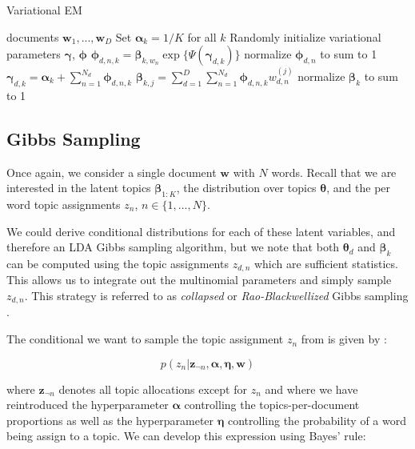 \documentclass{article}
\begin{document}
\begin{algorithm}[htb]
   \caption{Variational EM}
   \label{algo:EM}
\begin{algorithmic}
    documents $\mathbf{w}_1,...,\mathbf{w}_D$
   \STATE Set $\bm{\alpha}_k = 1 / K$ for all $k$ 
   \STATE Randomly initialize variational parameters $\bm{\gamma}$, $\bm{\phi}$ 
   \REPEAT
  	\STATE $\bm{\phi}_{d,n,k} = \bm{\beta}_{k, w_n} \exp\{\Psi(\bm{\gamma}_{d,k})\}$
  	\ENDFOR
  	\STATE normalize $\bm{\phi}_{d,n}$ to sum to 1
  	\STATE $\bm{\gamma}_{d,k} = \bm{\alpha}_k + \sum_{n=1}^{N_d} \bm{\phi}_{d,n,k}$
   \ENDFOR
   \ENDFOR
   \STATE $\bm{\beta}_{k,j} = \sum_{d=1}^D \sum_{n=1}^{N_d} \bm{\phi}_{d, n, k} w_{d,n}^{(j)}$
   \ENDFOR
   \STATE normalize $\bm{\beta}_k$ to sum to 1
   \ENDFOR
   \STATE 
\end{algorithmic}
\end{algorithm}

\subsection{Gibbs Sampling}

Once again, we consider a single document $\mathbf{w}$ with $N$ words. Recall that we are interested in the latent topics $\bm{\beta}_{1:K}$, the distribution over topics $\bm{\theta}$, and the per word topic assignments $z_{n}$, $n \in \{1,...,N\}$. 

We could derive conditional distributions for each of these latent variables, and therefore an LDA Gibbs sampling algorithm, but we note that both $\bm{\theta}_{d}$ and $\bm{\beta}_k$ can be computed using the topic assignments $z_{d,n}$ which are sufficient statistics. This allows us to integrate out the multinomial parameters and simply sample $z_{d,n}$. This strategy is referred to as \textit{collapsed} or \textit{Rao-Blackwellized} Gibbs sampling \cite{heinrich2005parameter}.

The conditional we want to sample the topic assignment $z_n$ from is given by :

\begin{equation*}
p(z_n|\mathbf{z}_{\neg n}, \bm{\alpha}, \bm{\eta}, \mathbf{w})
\end{equation*}

where $\mathbf{z}_{\neg n}$ denotes all topic allocations except for $z_n$ and where we have reintroduced the hyperparameter $\bm{\alpha}$ controlling the topics-per-document proportions as well as the hyperparameter $\bm{\eta}$ controlling the probability of a word being assign to a topic. We can develop this expression using Bayes' rule:
\end{document}
